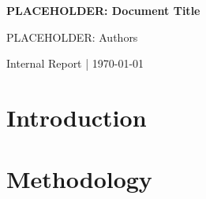 \documentclass[12pt]{article}
\begin{document}
\begin{center}
{\Large \textbf{PLACEHOLDER: Document Title}}

\medskip

PLACEHOLDER: Authors

\medskip

{\small Internal Report \hspace{1em}|\hspace{1em} \today}
\end{center}


\section{Introduction}\label{sec:intro}




\clearpage
\section{Methodology}\label{sec:method}






\clearpage
\end{document}
